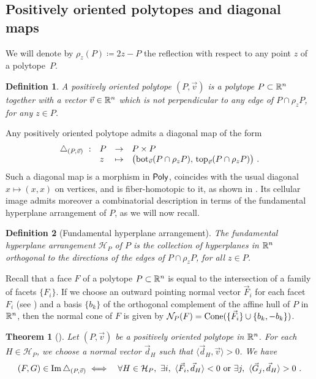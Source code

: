 \documentclass[twoside, 12pt]{amsart}
\newtheorem{definition}{Definition}[section]
\newtheorem{theorem}{Theorem}
\theoremstyle{remark}
\begin{document}
\subsection{Positively oriented polytopes and diagonal maps}

We will denote by $\rho_z (P) \coloneqq 2z-P$ the reflection with respect to any point $z$ of a polytope~$P$. 

\begin{definition}
A \emph{positively oriented polytope} $(P, \vec v)$ is a polytope $P \subset \mathbb{R}^n$ together with a vector $\vec v\in \mathbb{R}^n$ which is not perpendicular to any edge of $P\cap \rho_z P$, for any $z \in P$.
\end{definition}

Any positively oriented polytope admits a diagonal map of the form
\begin{align*}
\begin{array}{rlcl}
\triangle_{(P,\vec v)}\  : & P &\to  &P \times P\\
&z & \mapsto& 
\bigl(\operatorname{bot}_{\vec v}(P\cap \rho_zP),\,  \operatorname{top}_{\vec v}(P\cap \rho_z P)\bigr) \ .
\end{array}
\end{align*}
Such a diagonal map is a morphism in $\mathsf{Poly}$, coincides with the usual diagonal $x\mapsto (x, x)$ on vertices, and is fiber-homotopic to it, as shown in \cite[Proposition~5]{MTTV19}.
Its cellular image admits moreover a combinatorial description in terms of the fundamental hyperplane arrangement of $P$, as we will now recall.

\begin{definition}[Fundamental hyperplane arrangement]
  \label{def:fundamentalhyperplane} 
  The \emph{fundamental hyperplane arrangement} $\mathcal{H}_P$ of $P$ is the collection of hyperplanes in $\mathbb{R}^n$ orthogonal to the directions of the edges of $P\cap\rho_z P$, for all $z \in P$. 
\end{definition}

Recall that a face $F$ of a polytope $P \subset \mathbb{R}^n$ is equal to the intersection of a family of facets $\{F_i\}$. 
If we choose an outward pointing normal vector $\vec F_i$ for each facet $F_i$ (see \cite[Definition 1.24]{LA21}) and a basis $\{b_k\}$ of the orthogonal complement of the affine hull of $P$ in $\mathbb{R}^n$, then the normal cone of $F$ is given by $\mathcal{N}_P(F)=\operatorname{Cone}(\{\vec F_i\} \cup \{b_k,-b_k\})$. 

\begin{theorem}[{\cite[Theorem 1.23]{LA21}}]
  \label{thm:universalformula} 
  Let $(P,\vec v)$ be a positively oriented polytope in $\mathbb{R}^n$. For each $H\in\mathcal{H}_P$, we choose a normal vector $\vec d_H$ such that $\langle \vec d_H, \vec v \rangle >0$. We have 
\begin{eqnarray*}
  (F,G) \in \operatorname{Im} \triangle_{(P,\vec v)} 
  &\iff&  \forall H \in \mathcal{H}_P , \ \exists i , \ \langle \vec F_i, \vec d_H \rangle < 0  \text{ or } \exists j , \ \langle \vec G_j, \vec d_H \rangle > 0 \ . 
\end{eqnarray*} 
\end{theorem}
\end{document}
